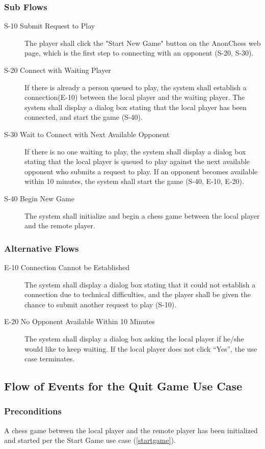 \subsubsection{Sub Flows}
\begin{description}
\item[S-10 Submit Request to Play] The player shall click the "Start New Game" button on the AnonChess web page, which is the first step to connecting with an opponent (S-20, S-30).
\item[S-20 Connect with Waiting Player] If there is already a person queued to play, the system shall establish a connection(E-10) between the local player and the waiting player.  The system shall display a dialog box stating that the local player has been connected, and start the game (S-40).
\item[S-30 Wait to Connect with Next Available Opponent] If there is no one waiting to play, the system shall display a dialog box stating that the local player is queued to play against the next available opponent who submits a request to play.  If an opponent becomes available within 10 minutes, the system shall start the game (S-40, E-10, E-20).
\item[S-40 Begin New Game] The system shall initialize and begin a chess game between the local player and the remote player.
\end{description}
\subsubsection{Alternative Flows}
\begin{description}
\item[E-10 Connection Cannot be Established] The system shall display a dialog box stating that it could not establish a connection due to technical difficulties, and the player shall be given the chance to submit another request to play (S-10).
\item[E-20 No Opponent Available Within 10 Minutes] The system shall display a dialog box asking the local player if he/she would like to keep waiting.  If the local player does not click “Yes”, the use case terminates.
\end{description}


\subsection{ Flow of Events for the Quit Game Use Case }
\label{quitgame}
\subsubsection{Preconditions}
  A chess game between the local player and the remote player has been initialized and started per the Start Game use case (\ref{startgame}). 
